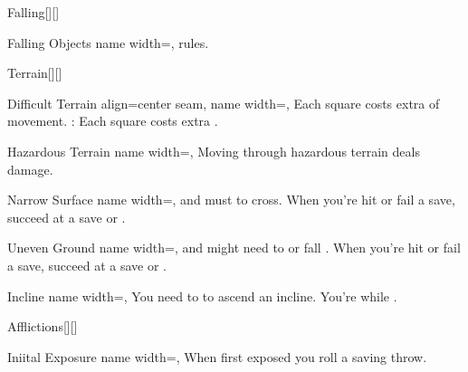 \begin{PageBack}
\begin{Tables}{\backTableHeight}
\begin{Table}{Falling}[][]
\begin{entry}{Falling Objects}{%
                name width=\turnLength,}
{                rules.}
            \end{entry}
        \end{Table}\TableSpace
        \begin{Table}{Terrain}[][]
            \begin{entry}{Difficult Terrain}{%
                align=center seam,
                name width=\turnLength,}
                Each square costs  extra \Feet of movement. \hfill {\textbf{}}: Each square costs  extra \Feet. \\\hfill{}
            \end{entry}
            \begin{entry}{Hazardous Terrain}{%
                name width=\turnLength,}
                Moving through hazardous terrain deals damage.
            \end{entry}
            \begin{entry}{Narrow Surface}{%
                name width=\turnLength,}
                \OffGuard and must  to cross. When you're hit or fail a
                save, succeed at a \ReflexT save or .
            \end{entry}
            \begin{entry}{Uneven Ground}{%
                name width=\turnLength,}
                \OffGuard and might need to  or fall \Prone. When you're hit
                or fail a save, succeed at a \ReflexT save or .
            \end{entry}
            \begin{entry}{Incline}{%
                name width=\turnLength,}
                You need to  to ascend an incline. You're \OffGuard while
                .
            \end{entry}
        \end{Table}\TableSpace
        \begin{Table}{Afflictions}[][]
            \begin{entry}{Iniital Exposure}{%
                name width=\turnLength,%
            }
                When first exposed you roll a saving throw.   \hfill {}
            \end{entry}

\end{Table}
\end{Tables}
\end{PageBack}
